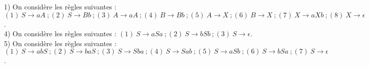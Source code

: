 \documentclass[11pt,a4paper]{article}
\begin{document}
1) On considère les règles suivantes : $(1) \ S \to aA  \ ; (2)  \ S \to Bb \ ; (3) \ A \to aA \ ; (4) \ B \to Bb \ ; (5) \ A \to X \ ; (6) \ B \to X \ ; (7) \ X \to aXb \ ; (8) \ X \to \epsilon$. \\

4) On considère les règles suivantes : $ (1) \ S \to aSa \ ; (2) \ S \to bSb \ ; (3) \ S \to \epsilon$. \\

5) On considère les règles suivantes : $(1) \ S \to abS \ ; (2) \ S \to baS \ ; (3) \ S \to Sba \ ; (4) \ S \to Sab \ ; (5) \ S \to aSb \ ; (6) \ S \to bSa \ ; (7) \ S \to \epsilon $.
\end{document}
